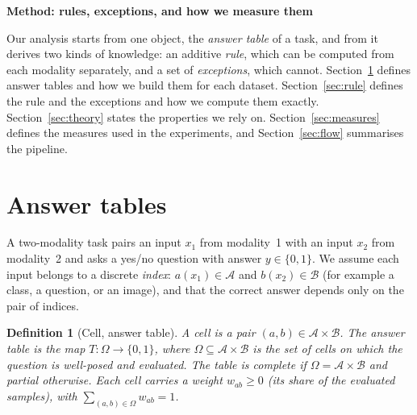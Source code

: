 \documentclass[11pt]{article}
\newtheorem{definition}{Definition}
\newcommand{\1}{\mathbf{1}}
\begin{document}
{\Large\bfseries Method: rules, exceptions, and how we measure them\par}\vspace{0.8em}

\noindent
Our analysis starts from one object, the \emph{answer table} of a task, and from it derives two kinds of knowledge:
an additive \emph{rule}, which can be computed from each modality separately, and a set of \emph{exceptions}, which
cannot. Section~\ref{sec:tables} defines answer tables and how we build them for each dataset.
Section~\ref{sec:rule} defines the rule and the exceptions and how we compute them exactly.
Section~\ref{sec:theory} states the properties we rely on. Section~\ref{sec:measures} defines the measures used in
the experiments, and Section~\ref{sec:flow} summarises the pipeline.

\section{Answer tables}\label{sec:tables}

A two-modality task pairs an input $x_1$ from modality~1 with an input $x_2$ from modality~2 and asks a yes/no question
with answer $y\in\{0,1\}$. We assume each input belongs to a discrete \emph{index}: $a(x_1)\in\mathcal{A}$ and
$b(x_2)\in\mathcal{B}$ (for example a class, a question, or an image), and that the correct answer depends only on the
pair of indices.

\begin{definition}[Cell, answer table]
A \emph{cell} is a pair $(a,b)\in\mathcal{A}\times\mathcal{B}$. The \emph{answer table} is the map
$T:\Omega\to\{0,1\}$, where $\Omega\subseteq\mathcal{A}\times\mathcal{B}$ is the set of cells on which the question is
well-posed and evaluated. The table is \emph{complete} if $\Omega=\mathcal{A}\times\mathcal{B}$ and \emph{partial}
otherwise. Each cell carries a weight $w_{ab}\ge 0$ (its share of the evaluated samples), with
$\sum_{(a,b)\in\Omega} w_{ab}=1$.
\end{definition}
\end{document}
